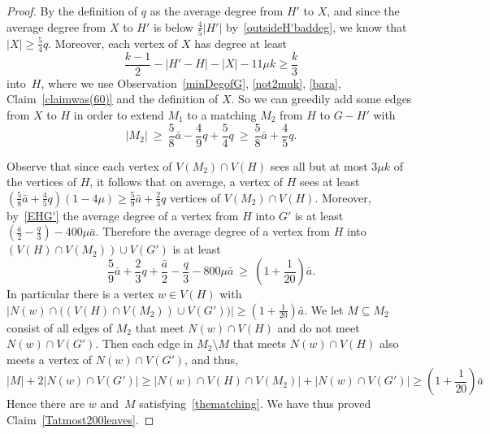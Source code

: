 \documentclass[10pt,a4paper]{amsart}
\begin{document}
\begin{proof}
By the definition of $q$ as the average degree from $H'$ to $X$, and since the average degree from $X$ to $H'$ is below $ \frac 45|H'|$ by~\eqref{outsideH'baddeg}, we know that $|X|\ge \frac 54q$. Moreover, each vertex of $X$ has degree at least $$\frac{k-1}2-|H'-H|-|X| - 11\mu k \ge \frac k3$$ into~$H$, where we use  Observation~\ref{minDegofG},  \eqref{not2muk}, \eqref{bara}, Claim~\ref{claimwas(60)}  and the definition of $X$.
So we can greedily add some edges from $X$ to $H$ in order to  extend $M_1$ to a matching $M_2$ from $H$ to $G-H'$ with $$|M_2|\ \ge \ \frac 58 \bar a-\frac 49 q+\frac 54 q\ \ge \ \frac 58 \bar a+\frac 45 q.$$

Observe that since each vertex of $V(M_2)\cap V(H)$ sees all but at most $3\mu k$ of the vertices of $H$, it follows that 
on average, a vertex of $H$ sees at least $(\frac 58 \bar a+\frac 45 q)(1-4\mu)\ge  \frac 59 \bar a+ \frac 23 q$ vertices of  $V(M_2)\cap V(H)$. 
Moreover, by~\eqref{EHG'} the average 
degree of a vertex from $H$ into $G'$ is at least 
 $(\frac{\bar a}2 -\frac q3) -400 \mu\bar a$. 
Therefore  the average 
degree of a vertex from $H$ into $ ( V(H) \cap V(M_2))\cup V(G')$   is at least  
$$ \frac 59 \bar a+ \frac 23 q + \frac{\bar a}2 -\frac q3 -800 \mu\bar a \ \ge\ ( 1 + \frac 1{20})\bar a.$$
In particular there is a vertex $w\in V(H)$ with $|N(w)\cap \big ((V(H)\cap V(M_2))\cup V(G') \big)|\ge (1 + \frac 1{20})\bar a$. We let $M\subseteq M_2$ consist of all edges of $M_2$ that meet $N(w)\cap V(H)$ and do not meet $N(w)\cap V(G')$. Then  each  edge in $M_2\setminus M$ that meets $N(w)\cap V(H)$ also meets
  a vertex of $N(w)\cap V(G')$, and thus,
$$|M|+2|N(w)\cap V(G')|\ge 
|N(w)\cap V(H)\cap V(M_2)|+|N(w)\cap V(G')|\ge
(1 + \frac 1{20})\bar a$$ 
Hence there are $w$ and~$M$ satisfying~\eqref{thematching}.
We have thus proved Claim~\ref{Tatmost200leaves}.
                      \end{proof}
\end{document}
